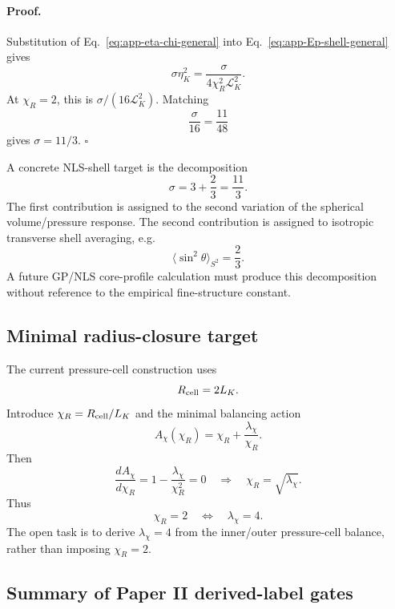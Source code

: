 \documentclass[11pt]{article}
\begin{document}
\paragraph{Proof.}
Substitution of Eq.~\eqref{eq:app-eta-chi-general} into
Eq.~\eqref{eq:app-Ep-shell-general} gives
\[
  \sigma\eta_K^2
  =
  \frac{\sigma}{4\chi_R^2\mathcal L_K^2}.
\]
At \(\chi_R=2\), this is \(\sigma/(16\mathcal L_K^2)\).  Matching
\[
  \frac{\sigma}{16}
  =
  \frac{11}{48}
\]
gives \(\sigma=11/3\). \(\square\)

A concrete NLS-shell target is the decomposition
\begin{equation}
  \sigma
  =
  3+\frac{2}{3}
  =
  \frac{11}{3}.
  \label{eq:app-sigma-decomposition}
\end{equation}
The first contribution is assigned to the second variation of the spherical
volume/pressure response.  The second contribution is assigned to isotropic
transverse shell averaging, e.g.
\[
  \langle \sin^2\theta\rangle_{S^2}=\frac{2}{3}.
\]
A future GP/NLS core-profile calculation must produce this decomposition
without reference to the empirical fine-structure constant.

\subsection{Minimal radius-closure target}

The current pressure-cell construction uses
\[
  R_{\rm cell}=2L_K.
\]
Introduce \(\chi_R=R_{\rm cell}/L_K\) and the minimal balancing action
\begin{equation}
  A_\chi(\chi_R)
  =
  \chi_R+\frac{\lambda_\chi}{\chi_R}.
  \label{eq:app-Achi-minimal}
\end{equation}
Then
\begin{equation}
  \frac{dA_\chi}{d\chi_R}
  =
  1-\frac{\lambda_\chi}{\chi_R^2}=0
  \quad\Longrightarrow\quad
  \chi_R=\sqrt{\lambda_\chi}.
\end{equation}
Thus
\begin{equation}
  \chi_R=2
  \quad\Longleftrightarrow\quad
  \lambda_\chi=4.
  \label{eq:app-chi-target}
\end{equation}
The open task is to derive \(\lambda_\chi=4\) from the inner/outer
pressure-cell balance, rather than imposing \(\chi_R=2\).

\subsection{Summary of Paper II derived-label gates}
\end{document}
